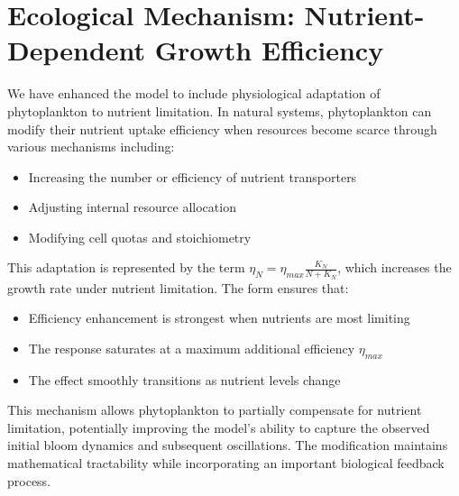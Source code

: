 \section{Ecological Mechanism: Nutrient-Dependent Growth Efficiency}

We have enhanced the model to include physiological adaptation of phytoplankton to nutrient limitation. In natural systems, phytoplankton can modify their nutrient uptake efficiency when resources become scarce through various mechanisms including:

\begin{itemize}
\item Increasing the number or efficiency of nutrient transporters
\item Adjusting internal resource allocation
\item Modifying cell quotas and stoichiometry
\end{itemize}

This adaptation is represented by the term $\eta_N = \eta_{max} \frac{K_N}{N + K_N}$, which increases the growth rate under nutrient limitation. The form ensures that:

\begin{itemize}
\item Efficiency enhancement is strongest when nutrients are most limiting
\item The response saturates at a maximum additional efficiency $\eta_{max}$
\item The effect smoothly transitions as nutrient levels change
\end{itemize}

This mechanism allows phytoplankton to partially compensate for nutrient limitation, potentially improving the model's ability to capture the observed initial bloom dynamics and subsequent oscillations. The modification maintains mathematical tractability while incorporating an important biological feedback process.
